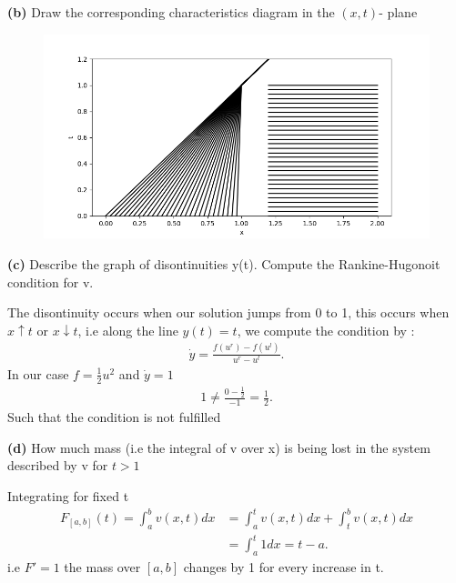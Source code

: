\begin{question}
  \textbf{(b)} Draw the corresponding characteristics diagram in the $(x,t)$- plane  
\end{question}
\begin{solution}
    \begin{figure}[H]
     \centering 
     \includegraphics[scale=0.5]{figures/sheet_4_char.png} 
   \end{figure}
\end{solution}
\begin{question}
  \textbf{(c)} Describe the graph of disontinuities y(t). Compute the Rankine-Hugonoit condition for v. 
\end{question}
\begin{solution}
 The disontinuity occurs when our solution jumps from 0 to 1, this occurs when $x \uparrow t$  or $x \downarrow t$, i.e along the line $y(t) = t$, we compute the condition by : 
 \begin{align*}
  \dot{y} = \frac{f(u^{r} )-f(u^{l} )}{u^{r} - u^{l}  } 
 .\end{align*}
 In our case $f = \frac{1}{2}u^{2} $ and $\dot{y} = 1 $ 
 \begin{align*}
  1 \neq  \frac{0 - \frac{1}{2}}{-1} = \frac{1}{2}
 .\end{align*}
 Such that the condition is not fulfilled  
\end{solution}
\begin{question}
  \textbf{(d)} How much mass (i.e the integral of v over x) is being lost in the system described by v for $t>1$
\end{question}
\begin{solution}
 Integrating for fixed t  
 \begin{align*}
   F_{[a,b]}(t) = \int_{a}^{b}  v(x,t) dx &= \int_{a}^{t} v(x,t) dx + \int_t^{b}  v(x,t) dx  \\
                           &= \int_{a}^{t} 1 dx   = t-a
 .\end{align*}
 i.e $F' = 1$  the mass over $[a,b]$ changes by 1 for every increase in t. 
\end{solution}
